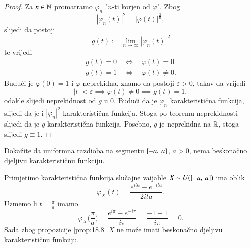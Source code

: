 \begin{proof}
    Za $n \in \mathbb{N}$ promatramo $\varphi_n$ "$n$-ti korjen od $\varphi$".
    Zbog
    \begin{equation*}
        |\varphi_n (t)|^2 = |\varphi (t)|^\frac{2}{n},
    \end{equation*}
    slijedi da postoji
    \begin{equation*}
        g (t) := \lim\limits_{n \to \infty} |\varphi_n (t)|^2
    \end{equation*}
    te vrijedi
    \begin{equation*}
        \begin{gathered}
            g (t) = 0 \quad \iff \quad \varphi (t) = 0\\
            g (t) = 1 \quad \iff \quad \varphi (t) \neq 0. 
        \end{gathered}
    \end{equation*}
    Budu\' ci je $\varphi (0) = 1$ i $\varphi$ neprekidna, znamo da postoji $\varepsilon > 0$, takav da vrijedi
    \begin{equation*}
        |t| < \varepsilon \implies \varphi (t) \neq 0 \implies g (t) = 1,
    \end{equation*}
    odakle slijedi neprekidnost od $g$ u $0$.
    Budu\' ci da je $\varphi_n$ karakteristi\v cna funkcija, slijedi da je i $|\varphi_n|^2$ karakteristi\v cna funkcija.
    Stoga po teoremu neprekidnosti slijedi da je $g$ karakteristi\v cna funkcija.
    Posebno, $g$ je neprekidna na $\mathbb{R}$, stoga slijedi $g \equiv 1$.
\end{proof}

\begin{zad} \label{zad:18.9}
    Doka\v zite da uniformna razdioba na segmentu $[{-a}, \:{a}]$, $a > 0$, nema beskona\v cno djeljivu karakteristi\v cnu funkciju.
\end{zad}

\begin{rj}[\ref{zad:18.9}]
    Primjetimo karakteristi\v cna funkcija slu\v cajne vaijable $X \sim U([{-a}, \:{a}])$ ima oblik
    \begin{equation*}
        \varphi_X (t) = \frac{e^{i t a} - e^{- i t a}}{2 i t a}.
    \end{equation*}
    Uzmemo li $t = \frac{\pi}{a}$ imamo
    \begin{equation*}
        \varphi_X \Big( \frac{\pi}{a} \Big) = \frac{e^{i \pi} - e^{- i \pi}}{i \pi} = \frac{-1 + 1}{i \pi } = 0.
    \end{equation*}
    Sada zbog propozicije \ref{prop:18.8} $X$ ne mo\v ze imati beskona\v cno djeljivu karakteristi\v cnu funkciju.
\end{rj}

